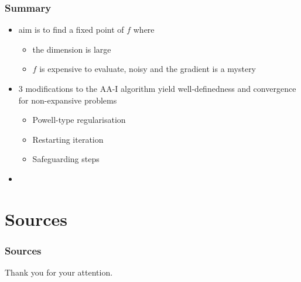\begin{frame}
	\frametitle{Summary}
	\begin{itemize}
		\item aim is to find a fixed point of $f$ where
		\begin{itemize}
			\item the dimension is large
			\item $f$ is expensive to evaluate, noisy and the gradient is a mystery
		\end{itemize}
		\item 3 modifications to the AA-I algorithm yield well-definedness and convergence for non-expansive problems
		\begin{itemize}
			\item Powell-type regularisation
			\item Restarting iteration
			\item Safeguarding steps
		\end{itemize}
		\item 
	\end{itemize}
\end{frame}

\section{Sources}

\begin{frame}[allowframebreaks]
	\frametitle{Sources}
	\nocite{*}
%	
%	
	\printbibliography
\end{frame}


\begin{frame}[plain]
	\begin{center}
		\Large{{Thank you for your attention.}}
	\end{center}
\end{frame}



